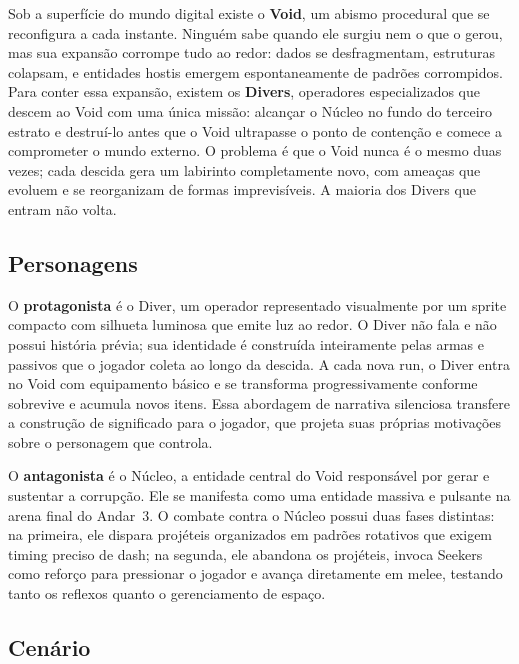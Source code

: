 \documentclass[12pt, a4paper]{article}
\begin{document}
Sob a superf\'icie do mundo digital existe o \textbf{Void}, um abismo procedural que se reconfigura a cada instante. Ningu\'em sabe quando ele surgiu nem o que o gerou, mas sua expans\~ao corrompe tudo ao redor: dados se desfragmentam, estruturas colapsam, e entidades hostis emergem espontaneamente de padr\~oes corrompidos. Para conter essa expans\~ao, existem os \textbf{Divers}, operadores especializados que descem ao Void com uma \'unica miss\~ao: alcan\c{c}ar o N\'ucleo no fundo do terceiro estrato e destru\'i-lo antes que o Void ultrapasse o ponto de conten\c{c}\~ao e comece a comprometer o mundo externo. O problema \'e que o Void nunca \'e o mesmo duas vezes; cada descida gera um labirinto completamente novo, com amea\c{c}as que evoluem e se reorganizam de formas imprevis\'iveis. A maioria dos Divers que entram n\~ao volta.

\subsection{Personagens}

O \textbf{protagonista} \'e o Diver, um operador representado visualmente por um sprite compacto com silhueta luminosa que emite luz ao redor. O Diver n\~ao fala e n\~ao possui hist\'oria pr\'evia; sua identidade \'e constru\'ida inteiramente pelas armas e passivos que o jogador coleta ao longo da descida. A cada nova run, o Diver entra no Void com equipamento b\'asico e se transforma progressivamente conforme sobrevive e acumula novos itens. Essa abordagem de narrativa silenciosa transfere a constru\c{c}\~ao de significado para o jogador, que projeta suas pr\'oprias motiva\c{c}\~oes sobre o personagem que controla.

O \textbf{antagonista} \'e o N\'ucleo, a entidade central do Void respons\'avel por gerar e sustentar a corrup\c{c}\~ao. Ele se manifesta como uma entidade massiva e pulsante na arena final do Andar~3. O combate contra o N\'ucleo possui duas fases distintas: na primeira, ele dispara proj\'eteis organizados em padr\~oes rotativos que exigem timing preciso de dash; na segunda, ele abandona os proj\'eteis, invoca Seekers como refor\c{c}o para pressionar o jogador e avan\c{c}a diretamente em melee, testando tanto os reflexos quanto o gerenciamento de espa\c{c}o.

\subsection{Cen\'ario}
\end{document}
